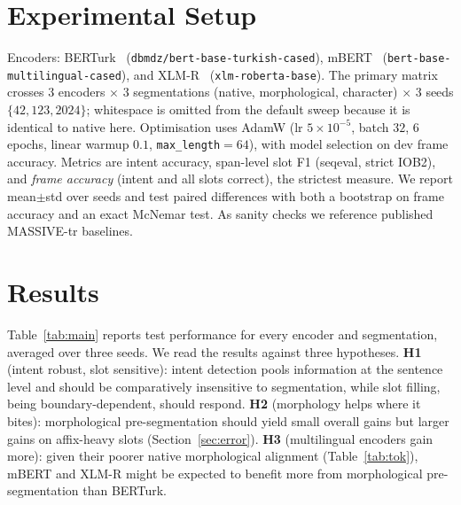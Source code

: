\documentclass[runningheads]{llncs}
\begin{document}
\section{Experimental Setup}
Encoders: BERTurk~\cite{schweter2020berturk}
(\texttt{dbmdz/bert-base-turkish-cased}), mBERT~\cite{devlin2019bert}
(\texttt{bert-base-multilingual-cased}), and XLM-R~\cite{conneau2020xlmr}
(\texttt{xlm-roberta-base}).
The primary matrix crosses $3$ encoders $\times$ $3$ segmentations (native,
morphological, character) $\times$ $3$ seeds $\{42,123,2024\}$; whitespace is
omitted from the default sweep because it is identical to native here.
Optimisation uses AdamW (lr $5\!\times\!10^{-5}$, batch $32$, $6$ epochs, linear
warmup $0.1$, \texttt{max\_length}$=64$), with model selection on dev frame
accuracy. Metrics are intent accuracy, span-level slot F1 (seqeval, strict IOB2),
and \emph{frame accuracy} (intent and all slots correct), the strictest measure.
We report mean$\pm$std over seeds and test paired differences with both a
bootstrap on frame accuracy and an exact McNemar test. As sanity checks we
reference published MASSIVE-tr baselines.

\section{Results}
Table~\ref{tab:main} reports test performance for every encoder and segmentation,
averaged over three seeds. We read the results against three hypotheses.
\textbf{H1} (intent robust, slot sensitive): intent detection pools information at
the sentence level and should be comparatively insensitive to segmentation, while
slot filling, being boundary-dependent, should respond. \textbf{H2} (morphology
helps where it bites): morphological pre-segmentation should yield small overall
gains but larger gains on affix-heavy slots (Section~\ref{sec:error}).
\textbf{H3} (multilingual encoders gain more): given their poorer native
morphological alignment (Table~\ref{tab:tok}), mBERT and XLM-R might be expected
to benefit more from morphological pre-segmentation than BERTurk.
\end{document}
